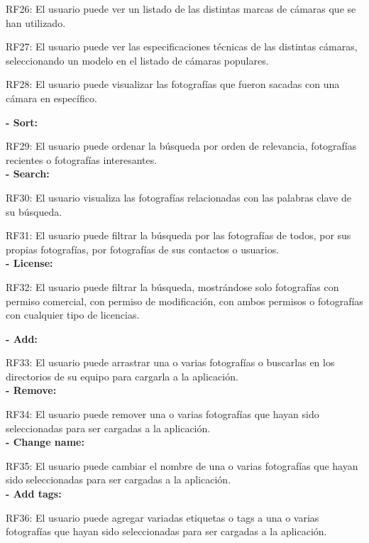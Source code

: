 \documentclass{memoria}
\begin{document}
RF26: El usuario puede ver un listado de las distintas marcas de cámaras que se han utilizado.

RF27: El usuario puede ver las especificaciones técnicas de las distintas cámaras, seleccionando un modelo en el listado de cámaras populares.

RF28: El usuario puede visualizar las fotografías que fueron sacadas con una cámara en específico.\\


\textbf{- Sort:} 

RF29: El usuario puede ordenar la búsqueda por orden de relevancia, fotografías recientes o fotografías interesantes.\\

\textbf{- Search:}

RF30: El usuario visualiza las fotografías relacionadas con las palabras clave de su búsqueda.

RF31: El usuario puede filtrar la búsqueda por las fotografías de todos, por sus propias fotografías, por fotografías de sus contactos o usuarios.\\

\textbf{- License:}

RF32: El usuario puede filtrar la búsqueda, mostrándose solo fotografías con permiso comercial, con permiso de modificación, con ambos permisos o fotografías con cualquier tipo de licencias.\\


\textbf{- Add:}

RF33: El usuario puede arrastrar una o varias fotografías o buscarlas en los directorios de su equipo para cargarla a la aplicación.\\

\textbf{- Remove:} 

RF34: El usuario puede remover una o varias fotografías que hayan sido seleccionadas para ser cargadas a la aplicación.\\ 

\textbf{- Change name:}

RF35: El usuario puede cambiar el nombre de una o varias fotografías que hayan sido seleccionadas para ser cargadas a la aplicación.\\

\textbf{- Add tags:}

RF36: El usuario puede agregar variadas etiquetas o tags a una o varias fotografías que hayan sido seleccionadas para ser cargadas a la aplicación.\\
\end{document}
